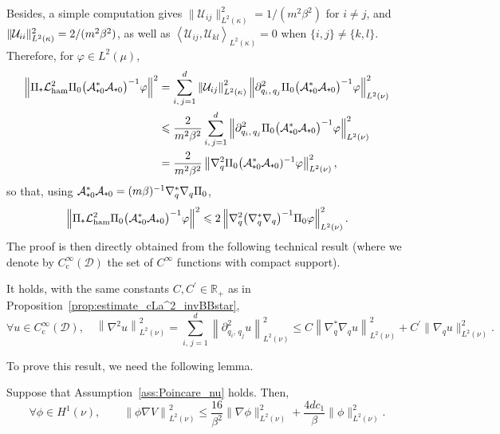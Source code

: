 \documentclass[AHL,Unicode,longabstracts,MathTools,published]{cedram}
\newcommand{\rmc}{\mathrm{c}}
\newcommand{\cLa}{\mathcal{A}}
\newcommand{\cD}{\mathcal{D}}
\newcommand{\cLU}{\mathcal{U}}
\newcommand{\R}{\mathbb{R}}
\newcommand{\cLham}{\mathcal{L}_{\rm ham}}
\newcommand{\subplus}{\textnormal{\texttt{+}}}
\renewcommand{\leq}{\leqslant}
\let\oldforall\forall
\renewcommand*{\forall}{\mathrel{\oldforall}}
\begin{document}
Besides, a simple computation gives $\|\cLU_{ij}\|_{L^2(\kappa)}^2 = 1/(m^2\beta^2)$ for $i\neq j$, and $\|\cLU_{ii}\|_{L^2(\kappa)}^2\linebreak = 2/(m^2\beta^2)$, as well as $\left \langle \cLU_{ij},\cLU_{kl}\right\rangle_{L^2(\kappa)} = 0$ when $\{i,j\} \neq \{k,l\}$. Therefore, for $\varphi \in L^2(\mu)$,
\begingroup
\allowdisplaybreaks
\begin{align*}
\left\|\Pi_\subplus\cLham^2 \Pi_0 \big(\cLa_{\subplus 0}^*\cLa_{\subplus 0}\big)^{-1} \varphi \right\|^2
&= \sum_{i,\,j=1}^d \left\|\cLU_{ij}\right\|_{L^2(\kappa)}^2 \left\| \partial_{q_i,\,q_j}^2 \Pi_0 \big(\cLa_{\subplus 0}^*\cLa_{\subplus 0}\big)^{-1}\varphi \right\|^2_{L^2(\nu)} \\
& \leq \frac{2}{m^2 \beta^2} \sum_{i,\,j=1}^d \left\| \partial_{q_i,\,q_j}^2 \Pi_0 \big(\cLa_{\subplus 0}^*\cLa_{\subplus 0}\big)^{-1}\varphi \right\|^2_{L^2(\nu)}
\\
&= \frac{2}{m^2 \beta^2} \left\| \nabla_q^2\Pi_0 \big(\cLa_{\subplus 0}^*\cLa_{\subplus 0})^{-1}\varphi \right\|_{L^2(\nu)}^2,
\end{align*}
\endgroup
so that, using $\cLa_{\subplus 0}^*\cLa_{\subplus 0} = (m\beta)^{-1} \nabla_q^*\nabla_q \Pi_0$,
\[
\left\|\Pi_\subplus\cLham^2 \Pi_0 \big(\cLa_{\subplus 0}^*\cLa_{\subplus 0}\big)^{-1} \varphi \right\|^2 \leq 2 \left\| \nabla_q^2 \big(\nabla_q^*\nabla_q\big)^{-1}\Pi_0 \varphi \right\|_{L^2(\nu)}^2.
\]
The proof is then directly obtained from the following technical result (where we denote by $C_\rmc^\infty(\cD)$ the set of $C^\infty$ functions with compact support).

\begin{lemm}\label{controlH2}
It holds, with the same constants $C,C^{'} \in
\R_+$ as in Proposition~\ref{prop:estimate_cLa^2_invBBstar},
\[
\forall u\in C_\rmc^\infty(\cD), \quad \left\| \nabla^2 u \right\|^2_{L^2(\nu)} = \sum_{i,\,j=1}^d \left\|\partial_{q_i,\,q_j}^2 u\right\|^2_{L^2(\nu)} \leq C\left\|\nabla_q^{*}\nabla_q u\right\|^2_{L^2(\nu)} + C^{'}\big\|\nabla_{q}u\big\|^2_{L^2(\nu)}.
\]
\end{lemm}


To prove this result, we need the following lemma.

\begin{lemm}\label{lem:VillaniA24}
Suppose that Assumption~\ref{ass:Poincare_nu} holds. Then,
\begin{equation}\label{Villanilemma}
\forall \phi \in H^{1}(\nu),
\qquad
\left\| \phi \nabla V\right\|^2_{L^2(\nu)} \leq \frac{16}{\beta^2} \|\nabla \phi\|^2_{L^2(\nu)} + \frac{4d c_1}{\beta} \|\phi\|^2_{L^2(\nu)}.
\end{equation}
\end{lemm}
\end{document}
